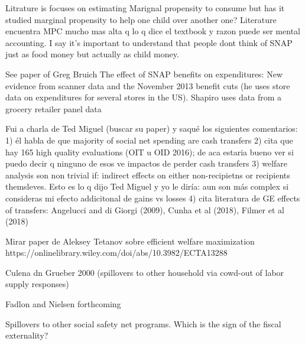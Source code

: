 \documentclass[12pt]{article}
\begin{document}
Litrature is focuses on estimating Marignal propensity to consume but has it studied marginal propensity to help one child over another one? Literature encuentra MPC mucho mas alta q lo q dice el textbook y razon puede ser mental accounting. I say it's important to understand that people dont think of SNAP just as food money but actually as child money.

See paper of Greg Bruich The effect of SNAP benefits on expenditures: New evidence from scanner data and the November 2013 benefit cuts (he uses store data on expenditures for several stores in the US). Shapiro uses data from a grocery retailer panel data

Fui a charla de Ted Miguel (buscar su paper) y saqué los siguientes comentarios:
1) él habla de que majority of social net spending are cash transfers
2) cita que hay 165 high quality evaluations (OIT u OID 2016); de aca estaria bueno ver si puedo decir q ninguno de esos ve impactos de perder cash transfers
3) welfare analysis son non trivial if: indirect effects on either non-recipietns or recipients themsleves. Esto es lo q dijo Ted Miguel y yo le diría: aun son más complex si consideras mi efecto addicitonal de gains vs losses
4) cita literatura de GE effects of transfers: Angelucci and di Giorgi (2009), Cunha et al (2018), Filmer et al (2018)

Mirar paper de Aleksey Tetanov sobre efficient welfare maximization https://onlinelibrary.wiley.com/doi/abs/10.3982/ECTA13288

Culena dn Grueber 2000 (spillovers to other household via cowd-out of labor supply responses)

Fadlon and Nielsen forthcoming

Spillovers to other social safety net programs. Which is the sign of the fiscal externality?
\end{document}
